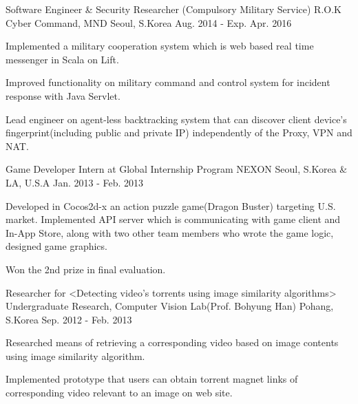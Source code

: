


\begin{cventries}


\cventry
{Software Engineer \& Security Researcher (Compulsory Military Service)} %
{R.O.K Cyber Command, MND} %
{Seoul, S.Korea} %
{Aug. 2014 - Exp. Apr. 2016} %
{ %
\begin{cvitems}
\item {Implemented a military cooperation system which is web based real time messenger in Scala on Lift.}
\item {Improved functionality on military command and control system for incident response with Java Servlet.}
\item {Lead engineer on agent-less backtracking system that can discover client device's fingerprint(including public and private IP) independently of the Proxy, VPN and NAT.}
\end{cvitems}
}


\cventry
{Game Developer Intern at Global Internship Program} %
{NEXON} %
{Seoul, S.Korea \& LA, U.S.A} %
{Jan. 2013 - Feb. 2013} %
{ %
\begin{cvitems}
\item {Developed in Cocos2d-x an action puzzle game(Dragon Buster) targeting U.S. market. Implemented API server which is communicating with game client and In-App Store, along with two other team members who wrote the game logic, designed game graphics.}
\item {Won the 2nd prize in final evaluation.}
\end{cvitems}
}


\cventry
{Researcher for <Detecting video’s torrents using image similarity algorithms>} %
{Undergraduate Research, Computer Vision Lab(Prof. Bohyung Han)} %
{Pohang, S.Korea} %
{Sep. 2012 - Feb. 2013} %
{ %
\begin{cvitems}
\item {Researched means of retrieving a corresponding video based on image contents using image similarity algorithm.}
\item {Implemented prototype that users can obtain torrent magnet links of corresponding video relevant to an image on web site.}
\end{cvitems} 
}


\end{cventries}
